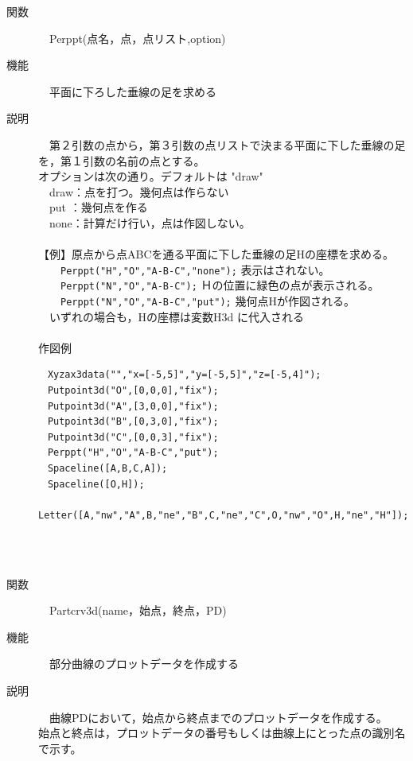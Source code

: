 \documentclass[papersize,a4paper,12pt,uplatex]{jsarticle}
\begin{document}
\begin{description}
\hypertarget{perppt}{}
\item[関数]　Perppt(点名，点，点リスト,option)
\item[機能]　平面に下ろした垂線の足を求める
\item[説明]　第２引数の点から，第３引数の点リストで決まる平面に下した垂線の足を，第１引数の名前の点とする。\\
オプションは次の通り。デフォルトは "draw"\\
　draw：点を打つ。幾何点は作らない\\
　put ：幾何点を作る\\
　none：計算だけ行い，点は作図しない。\\
　\\
【例】原点から点ABCを通る平面に下した垂線の足Hの座標を求める。\\
　　\verb|Perppt("H","O","A-B-C","none");| 表示はされない。\\
　　\verb|Perppt("N","O","A-B-C");| Ｈの位置に緑色の点が表示される。\\
　　\verb|Perppt("N","O","A-B-C","put");| 幾何点Hが作図される。\\
　いずれの場合も，Hの座標は変数H3d に代入される\\
　\\
作図例
\begin{verbatim}
　Xyzax3data("","x=[-5,5]","y=[-5,5]","z=[-5,4]");
　Putpoint3d("O",[0,0,0],"fix");
　Putpoint3d("A",[3,0,0],"fix");
　Putpoint3d("B",[0,3,0],"fix");
　Putpoint3d("C",[0,0,3],"fix");
　Perppt("H","O","A-B-C","put");
　Spaceline([A,B,C,A]);
　Spaceline([O,H]);
　Letter([A,"nw","A",B,"ne","B",C,"ne","C",O,"nw","O",H,"ne","H"]);
\end{verbatim}
　\\
　　　　　
　\\

\hypertarget{partcrv3d}{}
\item[関数]　Partcrv3d(name，始点，終点，PD)
\item[機能]　部分曲線のプロットデータを作成する
\item[説明]　曲線PDにおいて，始点から終点までのプロットデータを作成する。\\
始点と終点は，プロットデータの番号もしくは曲線上にとった点の識別名で示す。\\


\end{description}
\end{document}
